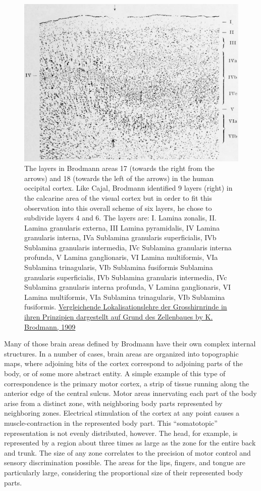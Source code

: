 \begin{figure}

{\centering \includegraphics[width=0.7\linewidth]{./figures/cns/cortex_area_17_18} 

}

\caption{The layers in Brodmann areas 17 (towards the right from the arrows) and 18 (towards the left of the arrows) in the human occipital cortex. Like Cajal, Brodmann identified 9 layers (right) in the calcarine area of the visual cortex but in order to fit this observation into this overall scheme of six layers, he chose to subdivide layers 4 and 6. The layers are: I. Lamina zonalis, II. Lamina granularis externa, III Lamina pyramidalis, IV Lamina granularis interna, IVa Sublamina granularis superficialis, IVb Sublamina granularis intermedia, IVc Sublamina granularis interna profunda, V Lamina ganglionaris, VI Lamina multiformis, VIa Sublamina trinagularis, VIb Sublamina fusiformis Sublamina granularis superficialis, IVb Sublamina granularis intermedia, IVc Sublamina granularis interna profunda, V Lamina ganglionaris, VI Lamina multiformis, VIa Sublamina trinagularis, VIb Sublamina fusiformis. \href{https://wellcomelibrary.org/item/b28062449}{Vergleichende Lokalisationslehre der Grosshirnrinde in ihren Prinzipien dargestellt auf Grund des Zellenbaues by K. Brodmann, 1909}}\label{fig:viscortex}
\end{figure}

Many of those brain areas defined by Brodmann have their own complex internal structures. In a number of cases, brain areas are organized into topographic maps, where adjoining bits of the cortex correspond to adjoining parts of the body, or of some more abstract entity. A simple example of this type of correspondence is the primary motor cortex, a strip of tissue running along the anterior edge of the central sulcus. Motor areas innervating each part of the body arise from a distinct zone, with neighboring body parts represented by neighboring zones. Electrical stimulation of the cortex at any point causes a muscle-contraction in the represented body part. This ``somatotopic'' representation is not evenly distributed, however. The head, for example, is represented by a region about three times as large as the zone for the entire back and trunk. The size of any zone correlates to the precision of motor control and sensory discrimination possible. The areas for the lips, fingers, and tongue are particularly large, considering the proportional size of their represented body parts.

